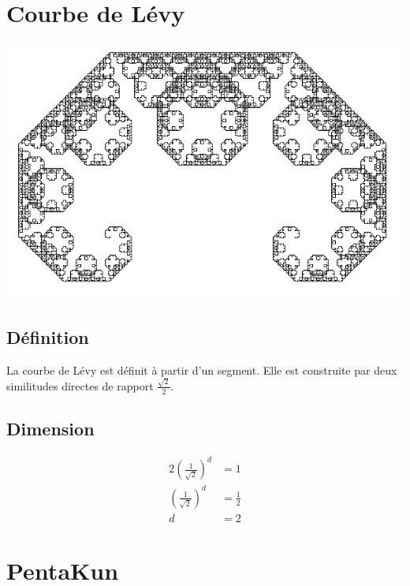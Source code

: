 \documentclass[a4paper, 12pt]{report}
\begin{document}
\newpage
		\section{Courbe de Lévy}
			\begin{center}
				\includegraphics[scale=0.7]{Images/levy}
			\end{center}
			\subsection{Définition}
				La courbe de Lévy est définit à partir d'un segment. Elle est construite par deux similitudes directes de rapport $\frac{\sqrt{2}}{2}$.
			
			\subsection{Dimension}
				\begin{align*}
					 2\left(\frac{1}{\sqrt{2}}\right)^d	&=1\\
					 \left(\frac{1}{\sqrt{2}}\right)^d	&=\frac{1}{2}\\
													d	&=2
				\end{align*}
\newpage
		\section{PentaKun}
		\label{Pentakun}
\end{document}
